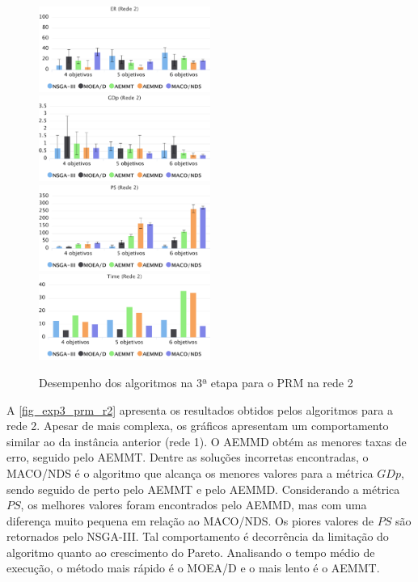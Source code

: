 \begin{figure}[!htbp]	
	\includegraphics[width=0.5\textwidth]{cap_experimentos/figs/etapa3/er-mrp-r2}
	\includegraphics[width=0.5\textwidth]{cap_experimentos/figs/etapa3/gd-mrp-r2}
	\includegraphics[width=0.5\textwidth]{cap_experimentos/figs/etapa3/ps-mrp-r2}
	\includegraphics[width=0.5\textwidth]{cap_experimentos/figs/etapa3/time-mrp-r2}
	\caption{\label{fig_exp3_prm_r2}Desempenho dos algoritmos na 3ª etapa para o PRM na rede 2}
\end{figure}

A \autoref{fig_exp3_prm_r2} apresenta os resultados obtidos pelos algoritmos para a rede 2. Apesar de mais complexa, os gráficos apresentam um comportamento similar ao da instância anterior (rede 1). O AEMMD obtém as menores taxas de erro, seguido pelo AEMMT. Dentre as soluções incorretas encontradas, o MACO/NDS é o algoritmo que alcança os menores valores para a métrica $GDp$, sendo seguido de perto pelo AEMMT e pelo AEMMD. Considerando a métrica $PS$, os melhores valores foram encontrados pelo AEMMD, mas com uma diferença muito pequena em relação ao MACO/NDS. Os piores valores de $PS$ são retornados pelo NSGA-III. Tal comportamento é decorrência da limitação do algoritmo quanto ao crescimento do Pareto. Analisando o tempo médio de execução, o método mais rápido é o MOEA/D e o mais lento é o AEMMT.

